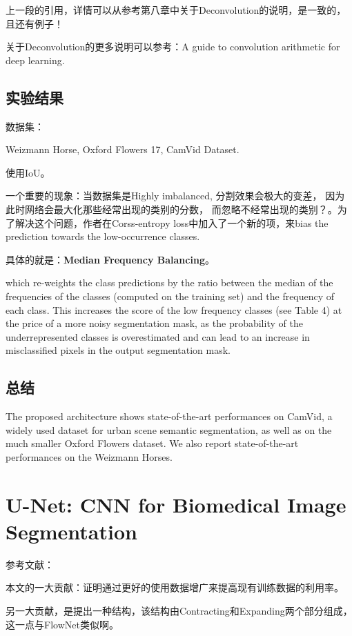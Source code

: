 上一段的引用，详情可以从参考第八章中关于Deconvolution的说明，是一致的，且还有例子！

关于Deconvolution的更多说明可以参考：A guide to convolution arithmetic for deep learning.

\subsection{实验结果}

数据集：

Weizmann Horse, Oxford Flowers 17, CamVid Dataset.

使用IoU。

一个重要的现象：当数据集是Highly imbalanced, 分割效果会极大的变差， 因为此时网络会最大化那些经常出现的类别的分数， 而忽略不经常出现的类别？。为了解决这个问题，作者在Corss-entropy loss中加入了一个新的项，来bias the prediction towards the low-occurrence classes.

具体的就是：\textbf{Median Frequency Balancing}。

which re-weights the class predictions by the ratio between the median of the frequencies of the classes
(computed on the training set) and the frequency of each class. This increases the score of the low frequency classes (see Table 4) at the price of a more noisy segmentation mask, as the probability of the underrepresented classes is overestimated and can lead to an increase in misclassified pixels in the output segmentation mask.

\subsection{总结}

The proposed architecture shows state-of-the-art performances on
CamVid, a widely used dataset for urban scene semantic
segmentation, as well as on the much smaller Oxford Flowers dataset. We also report state-of-the-art performances on the Weizmann Horses.

\section[U-Net]{U-Net: CNN for Biomedical Image Segmentation}

参考文献：\cite{U-Net2015}

本文的一大贡献：证明通过更好的使用数据增广来提高现有训练数据的利用率。

另一大贡献，是提出一种结构，该结构由Contracting和Expanding两个部分组成，这一点与FlowNet类似啊。	

